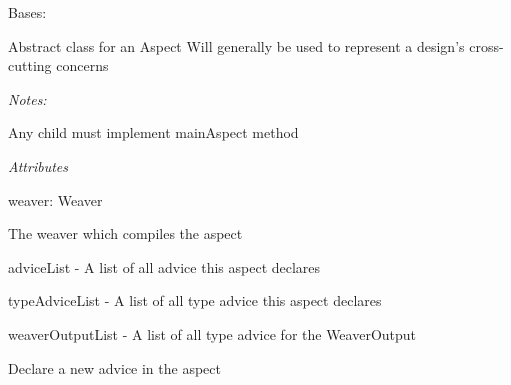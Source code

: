 \documentclass[letterpaper,10pt,english]{sphinxmanual}
\begin{document}
\begin{fulllineitems}
\label{modules/index:aosb.core.Aspect}
Bases: 

Abstract class for an Aspect
\textbar{} Will generally be used to represent a design's cross-cutting concerns

\begin{DUlineblock}{0em}
\item[] \emph{Notes:}
\item[]
\begin{DUlineblock}{\DUlineblockindent}
\item[] Any child must implement mainAspect method
\end{DUlineblock}
\end{DUlineblock}

\begin{DUlineblock}{0em}
\item[] \emph{Attributes}
\item[]
\begin{DUlineblock}{\DUlineblockindent}
\item[] weaver: Weaver
\item[]
\begin{DUlineblock}{\DUlineblockindent}
\item[] The weaver which compiles the aspect
\end{DUlineblock}
\item[] adviceList - A list of all advice this aspect declares
\item[] typeAdviceList - A list of all type advice this aspect declares
\item[] weaverOutputList - A list of all type advice for the WeaverOutput
\end{DUlineblock}
\end{DUlineblock}

\begin{fulllineitems}
\label{modules/index:aosb.core.Aspect.addAdvice}
Declare a new advice in the aspect


\end{fulllineitems}
\end{fulllineitems}
\end{document}
